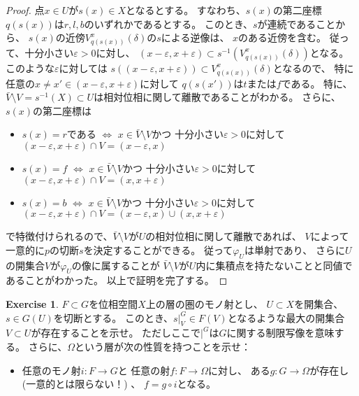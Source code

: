 \documentclass[uplatex]{jsarticle}
\theoremstyle{definition}
\newtheorem{prob}[prob]{Exercise}
\def\ep{\varepsilon}
\begin{document}
\begin{proof}
  点\(x\in U\)が\(s(x)\in X\)となるとする。
  すなわち、\(s(x)\)の第二座標\(q(s(x))\)は\(r,l,b\)のいずれかであるとする。
  このとき、\(s\)が連続であることから、
  \(s(x)\)の近傍\(V_{q(s(x))}^x(\delta)\)の\(s\)による逆像は、
  \(x\)のある近傍を含む。
  従って、十分小さい\(\ep > 0\)に対し、
  \((x-\ep,x+\ep) \subset s^{-1}(V_{q(s(x))}^x(\delta))\)となる。
  このような\(\ep\)に対しては
  \(s((x-\ep,x+\ep)) \subset V_{q(s(x))}^x(\delta)\)となるので、
  特に任意の\(x\neq x'\in (x-\ep,x+\ep)\)に対して
  \(q(s(x'))\)は\(t\)または\(f\)である。
  特に、\(\bar{V}\setminus V = s^{-1}(X)\subset U\)は相対位相に関して離散であることがわかる。
  さらに、\(s(x)\)の第二座標は
  \begin{itemize}
    \item
    \(s(x) = r\)である \(\Leftrightarrow\)
    \(x\in\bar{V}\setminus V\)かつ
    十分小さい\(\ep > 0\)に対して\((x-\ep,x+\ep)\cap V = (x-\ep,x)\)
    \item
    \(s(x) = f\) \(\Leftrightarrow\)
    \(x\in\bar{V}\setminus V\)かつ
    十分小さい\(\ep > 0\)に対して\((x-\ep,x+\ep)\cap V = (x,x+\ep)\)
    \item
    \(s(x) = b\) \(\Leftrightarrow\)
    \(x\in\bar{V}\setminus V\)かつ
    十分小さい\(\ep > 0\)に対して\((x-\ep,x+\ep)\cap V = (x-\ep,x)\cup (x,x+\ep)\)
  \end{itemize}
  で特徴付けられるので、\(\bar{V}\setminus V\)が\(U\)の相対位相に関して離散であれば、
  \(V\)によって一意的に\(p\)の切断\(s\)を決定することができる。
  従って\(\varphi_U\)は単射であり、
  さらに\(U\)の開集合\(V\)が\(\varphi_U\)の像に属することが
  \(\bar{V}\setminus V\)が\(U\)内に集積点を持たないことと同値であることがわかった。
  以上で証明を完了する。
\end{proof}


\begin{prob}\label{prob: 0.6}
  \(F\subset G\)を位相空間\(X\)上の層の圏のモノ射とし、
  \(U\subset X\)を開集合、
  \(s\in G(U)\)を切断とする。
  このとき、\(s|_V^G\in F(V)\)となるような最大の開集合\(V\subset U\)が存在することを示せ。
  ただしここで\(|^G\)は\(G\)に関する制限写像を意味する。
  さらに、\(\Omega\)という層が次の性質を持つことを示せ：
  \begin{itemize}
    \item
    任意のモノ射\(i:F\to G\)と
    任意の射\(f:F\to \Omega\)に対し、
    ある\(g:G\to \Omega\)が存在し (一意的とは限らない！) 、
    \(f=g\circ i\)となる。
  \end{itemize}
\end{prob}
\end{document}
